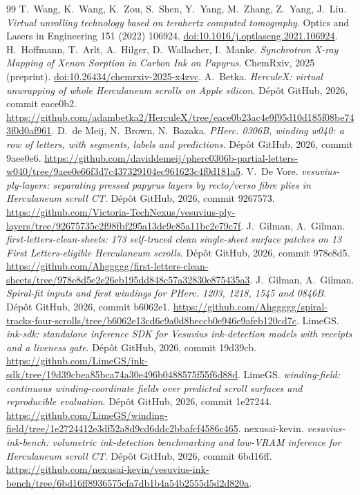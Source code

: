 \documentclass[11pt,a4paper]{article}
\begin{document}
\begin{thebibliography}{99}
 T.~Wang, K.~Wang, K.~Zou, S.~Shen, Y.~Yang, M.~Zhang, Z.~Yang, J.~Liu. \emph{Virtual unrolling technology based on terahertz computed tomography}. Optics and Lasers in Engineering 151 (2022) 106924. \href{https://doi.org/10.1016/j.optlaseng.2021.106924}{doi:10.1016/j.optlaseng.2021.106924}.
 H.~Hoffmann, T.~Arlt, A.~Hilger, D.~Wallacher, I.~Manke. \emph{Synchrotron X-ray Mapping of Xenon Sorption in Carbon Ink on Papyrus}. ChemRxiv, 2025 (preprint). \href{https://doi.org/10.26434/chemrxiv-2025-x4zvc}{doi:10.26434/chemrxiv-2025-x4zvc}.
 A.~Betka. \emph{HerculeX: virtual unwrapping of whole Herculaneum scrolls on Apple silicon}. Dépôt GitHub, 2026, commit eace0b2. \url{https://github.com/adambetka2/HerculeX/tree/eace0b23ac4e9f95d10d185f08be743f0d0af961}.
 D.~de Meij, N.~Brown, N.~Bazaka. \emph{PHerc. 0306B, winding w040: a row of letters, with segments, labels and predictions}. Dépôt GitHub, 2026, commit 9aee0e6. \url{https://github.com/daviddemeij/pherc0306b-partial-letters-w040/tree/9aee0e66f3d7c437329104ec961623c4f0d181a5}.
 V.~De Vore. \emph{vesuvius-ply-layers: separating pressed papyrus layers by recto/verso fibre plies in Herculaneum scroll CT}. Dépôt GitHub, 2026, commit 9267573. \url{https://github.com/Victoria-TechNexus/vesuvius-ply-layers/tree/92675735c2f98fbf295a13dc9c85a11bc2e79c7f}.
 J.~Gilman, A.~Gilman. \emph{first-letters-clean-sheets: 173 self-traced clean single-sheet surface patches on 13 First Letters-eligible Herculaneum scrolls}. Dépôt GitHub, 2026, commit 978e8d5. \url{https://github.com/Ahggggg/first-letters-clean-sheets/tree/978e8d5e2e26eb195dd848c57a32830e875435a3}.
 J.~Gilman, A.~Gilman. \emph{Spiral-fit inputs and first windings for PHerc. 1203, 1218, 1545 and 0846B}. Dépôt GitHub, 2026, commit b6062e1. \url{https://github.com/Ahggggg/spiral-tracks-four-scrolls/tree/b6062e13cd6c9a0d8beccb0e946e9afeb120cd7c}.
 LimeGS. \emph{ink-sdk: standalone inference SDK for Vesuvius ink-detection models with receipts and a liveness gate}. Dépôt GitHub, 2026, commit 19d39cb. \url{https://github.com/LimeGS/ink-sdk/tree/19d39cbea85bca74a30e496b0488575f55f6d88d}.
 LimeGS. \emph{winding-field: continuous winding-coordinate fields over predicted scroll surfaces and reproducible evaluation}. Dépôt GitHub, 2026, commit 1e27244. \url{https://github.com/LimeGS/winding-field/tree/1e2724412e3df52a8d9cd6ddc2bbafcf4586c465}.
 nexusai-kevin. \emph{vesuvius-ink-bench: volumetric ink-detection benchmarking and low-VRAM inference for Herculaneum scroll CT}. Dépôt GitHub, 2026, commit 6bd16ff. \url{https://github.com/nexusai-kevin/vesuvius-ink-bench/tree/6bd16ff8936575cfa7db1b4a54b2555d5d2d820a}.

\end{thebibliography}
\end{document}
